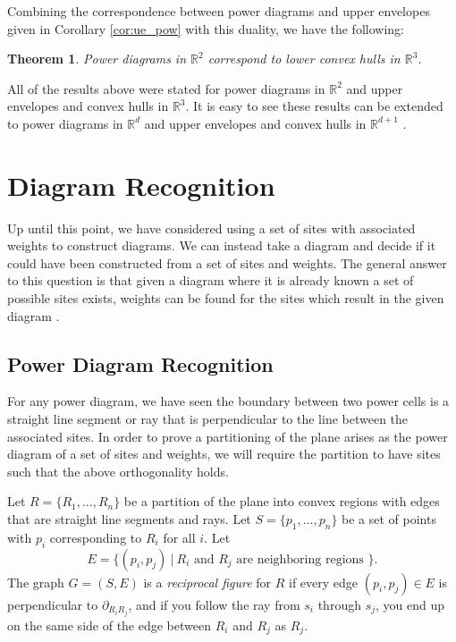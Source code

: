 \documentclass[a4paper, 11pt]{article}
\newtheorem{theorem}{Theorem}[section]
\newcommand{\R}{\mathbb{R}}
\begin{document}
Combining the correspondence between power diagrams and upper envelopes given in Corollary \ref{cor:ue_pow} with this duality, we have the following:

\begin{theorem}
  Power diagrams in $\R^2$ correspond to lower convex hulls in $\R^3$.
  \label{thm:ch_pow}
\end{theorem}

All of the results above were stated for power diagrams in $\R^2$ and upper envelopes and convex hulls in $\R^3$. It is easy to see these results can
be extended to power diagrams in $\R^d$ and upper envelopes and convex hulls in $\R^{d+1}$ \cite{aurenhammer_power}.

\section{Diagram Recognition}

Up until this point, we have considered using a set of sites with associated weights to construct diagrams. We can instead take a diagram and decide
if it could have been constructed from a set of sites and weights. The general answer to this question is that given a diagram where it is already
known a set of possible sites exists, weights can be found for the sites which result in the given diagram \cite{ash-bolker}.

\subsection{Power Diagram Recognition}

For any power diagram, we have seen the boundary between two power cells is a straight line segment or ray that is perpendicular to the line between
the associated sites. In order to prove a partitioning of the plane arises as the power diagram of a set of sites and weights, we will require the
partition to have sites such that the above orthogonality holds.

Let $R = \{ R_1,\dots, R_n \}$ be a partition of the plane into convex regions with edges that are straight line segments and rays. Let $S = \{ p_1,
\dots, p_n \}$ be a set of points with $p_i$ corresponding to $R_i$ for all $i$. Let
\[ E = \{ (p_i, p_j) \ | \ R_i \text{ and } R_j \text{ are neighboring regions } \} . \]
The graph $G = (S,E)$ is a \textit{reciprocal figure} for $R$ if every edge $(p_i, p_j) \in E$ is perpendicular to $\partial_{R_i R_j}$,
and if you follow the ray from $s_i$ through $s_j$, you end up on the same side of the edge between $R_i$ and $R_j$ as $R_j$.
\end{document}
